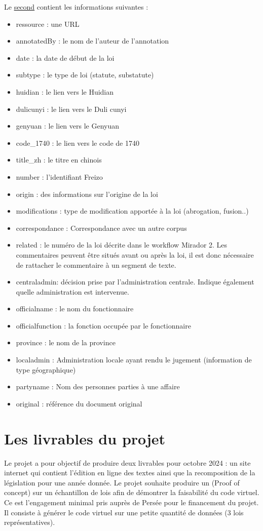 Le \href{https://sharedocs.huma-num.fr/wl/?id=yHHcUPKWyusazIZqWVLgtbZI7J65OaLA&path=Export_Freizo%2Fdc-anno-dump-2002-04-14-v2.xls&mode=grid}{second} contient les informations suivantes : 
\begin{itemize}
    \item ressource : une URL
    \item annotatedBy : le nom de l’auteur de l’annotation
    \item  date : la date de début de la loi
    \item  subtype : le type de loi (statute, substatute)
    \item  huidian : le lien vers le Huidian
    \item  dulicunyi : le lien vers le Duli cunyi
    \item  genyuan : le lien vers le Genyuan
    \item  code\_1740 : le lien vers le code de 1740
    \item  title\_zh : le titre en chinois
    \item  number : l’identifiant Freizo
    \item  origin : des informations sur l’origine de la loi
    \item modifications : type de modification apportée à la loi (abrogation, fusion..)
    \item  correspondance : Correspondance avec un autre corpus
    \item related : le numéro de la loi décrite dans le workflow Mirador 2. Les commentaires peuvent être situés avant ou après la loi, il est donc nécessaire de rattacher le commentaire à un segment de texte.
    \item  centraladmin: décision prise par l’administration centrale. Indique également quelle administration est intervenue.
    \item  officialname : le nom du fonctionnaire 
    \item officialfunction : la fonction occupée par le fonctionnaire
    \item  province : le nom de la province
    \item  localadmin : Administration locale ayant rendu le jugement (information de type géographique)
    \item  partyname : Nom des personnes parties à une affaire
    \item original : référence du document original
\end{itemize}
\newpage

\section*{Les livrables du projet}
Le projet \COREL a pour objectif de produire deux livrables pour octobre 2024 : un site internet qui contient l’édition en ligne des textes ainsi que la recomposition de la législation pour une année donnée. Le projet souhaite produire un \POC (Proof of concept) sur un échantillon de lois afin de démontrer la faisabilité du code virtuel. Ce \POC est l’engagement minimal pris auprès de \CollEx Persée pour le financement du projet. Il consiste à générer le code virtuel sur une petite quantité de données (3 lois représentatives).

